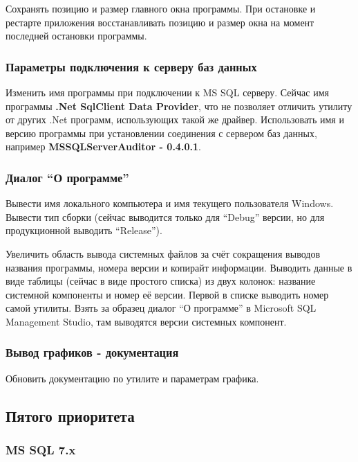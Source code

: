\bigskip

Сохранять позицию и размер главного окна программы. При остановке и рестарте приложения
восстанавливать позицию и размер окна на момент последней остановки программы.

\subsubsection{Параметры подключения к серверу баз данных}

Изменить имя программы при подключении к MS SQL серверу. Сейчас имя программы \textbf{.Net SqlClient
Data Provider}, что не позволяет отличить утилиту от других .Net программ, использующих такой же
драйвер. Использовать имя и версию программы при установлении соединения с сервером баз данных,
например \textbf{MSSQLServerAuditor - 0.4.0.1}.

\subsubsection{Диалог ``О программе''}

Вывести имя локального компьютера и имя текущего пользователя Windows. Вывести тип сборки (сейчас
выводится только для ``Debug'' версии, но для продукционной выводить ``Release'').

\bigskip

Увеличить область вывода системных файлов за счёт сокращения выводов названия программы, номера
версии и копирайт информации. Выводить данные в виде таблицы (сейчас в виде простого списка) из двух
колонок: название системной компоненты и номер её версии. Первой в списке выводить номер самой
утилиты. Взять за образец диалог ``О программе'' в Micro\-soft SQL Mana\-gement Studio, там выводятся
версии системных компонент.

\subsubsection{Вывод графиков - документация}

Обновить документацию по утилите и параметрам графика.

\subsection{Пятого приоритета}

\subsubsection{MS SQL 7.x}

